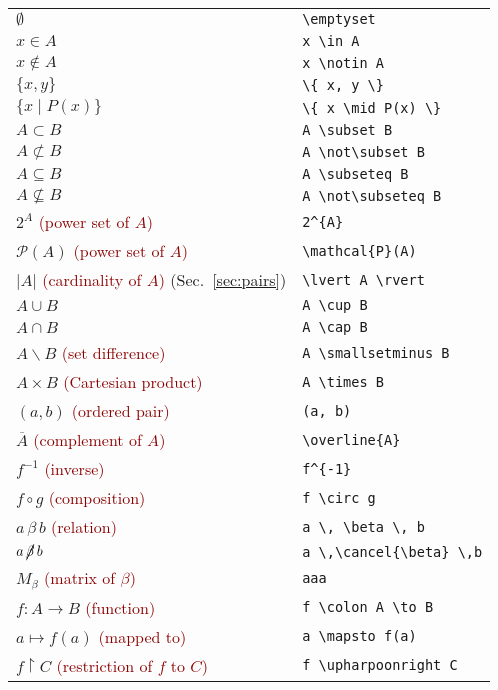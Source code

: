 \documentclass[a4paper,10pt,landscape]{article}
\theoremstyle{definition}
\theoremstyle{remark}
\newcommand{\refsec}[1]{Sec.~\ref{#1}}
\newcommand{\hDesc}[1]{\textcolor{darkred}{(#1)}} %
\begin{document}
\begin{multicols}{3}
\begin{tabular}{@{}ll@{}}
	$\emptyset$	&\verb!\emptyset!\\
	$x \in A$	&\verb!x \in A!\\
	$x \notin A$	&\verb!x \notin A!\\
	$\{ x, y \}$	& \verb!\{ x, y \}!\\
	$\{ x \mid P(x) \}$	&\verb!\{ x \mid P(x) \}!\\
	$A \subset B$	&\verb!A \subset B!\\
	$A \not\subset B$	&\verb!A \not\subset B!\\
	$A \subseteq B$	&\verb!A \subseteq B!\\
	$A \not\subseteq B$	&\verb!A \not\subseteq B!\\
	$2^{A}$ 	\hDesc{power set of $A$}	&\verb!2^{A}!\\
	$\mathcal{P}(A)$ 	\hDesc{power set of $A$}	&\verb!\mathcal{P}(A)!\\
	$\lvert A \rvert$  	\hDesc{cardinality of $A$} (\refsec{sec:pairs})	&\verb!\lvert A \rvert!\\
	$A \cup B$	&\verb!A \cup B!\\
	$A \cap B$	&\verb!A \cap B!\\
	$A \smallsetminus B$	\hDesc{set difference}	&\verb!A \smallsetminus B!\\
	$A \times B$  	\hDesc{Cartesian product}	&\verb!A \times B!\\
	$(a, b)$ 	\hDesc{ordered pair}	&\verb!(a, b)!\\
%	
	$\overline{A}$	\hDesc{complement of $A$}	&\verb!\overline{A}!\\
	$f^{-1}$	\hDesc{inverse}	&\verb!f^{-1}!\\
	$f \circ g$	\hDesc{composition}	&\verb!f \circ g!\\
	$a \, \beta \, b$ 	\hDesc{relation}	&\verb!a \, \beta \, b!\\
	$a \, \cancel{\beta} \, b$	&\verb!a \,\cancel{\beta} \,b!\\
	$M_{\beta}$ 	\hDesc{matrix of $\beta$}	&\verb!aaa!\\
	$f \colon A \to B$	\hDesc{function}	&\verb!f \colon A \to B!\\
	$a \mapsto f(a)$	\hDesc{mapped to}	&\verb!a \mapsto f(a)!\\
	$f \upharpoonright C$	\hDesc{restriction of $f$ to $C$}	
		&\verb!f \upharpoonright C!\\

\end{tabular}
\end{multicols}
\end{document}
